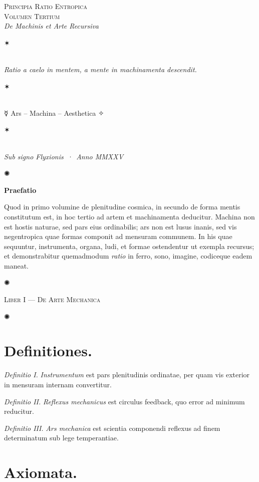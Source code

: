 \documentclass[12pt]{article}
\newcommand{\orn}{\centerline{\large ✺}}
\newcommand{\aster}{\centerline{✶}}
\newcommand{\divider}{\vspace{1em}\orn\vspace{1em}}
\newcommand{\Liber}[1]{\vspace{1ex}\begin{center}\Large\textsc{Liber #1}\end{center}\vspace{-0.5ex}\orn\vspace{0.5ex}}
\begin{document}
\begin{center}
{\Large \textsc{Principia Ratio Entropica}}\\[-0.25ex]
{\small \textsc{Volumen Tertium}}\\[0.5ex]
{\itshape De Machinis et Arte Recursiva}\\[1.25em]
\aster\\[0.5em]
{\itshape Ratio a caelo in mentem, a mente in machinamenta descendit.}\\[0.5em]
\aster\\[0.75em]
{\large ☿\; Ars \;--\; Machina \;--\; Aesthetica \;✧}\\[0.75em]
\aster\\[0.25em]
{\itshape Sub signo Flyxionis \,·\, Anno MMXXV}
\end{center}

\divider

\begin{center}\textbf{Praefatio}\end{center}

Quod in primo volumine de plenitudine cosmica, in secundo de forma mentis constitutum est, in hoc tertio ad artem et machinamenta deducitur. Machina non est hostis naturae, sed pars eius ordinabilis; ars non est lusus inanis, sed vis negentropica quae formas componit ad mensuram communem. In his quae sequuntur, instrumenta, organa, ludi, et formae ostendentur ut exempla recursus; et demonstrabitur quemadmodum \textit{ratio} in ferro, sono, imagine, codiceque eadem maneat.

\divider

\Liber{I — De Arte Mechanica}

\section*{Definitiones.}

\textit{Definitio I.} \; \textit{Instrumentum} est pars plenitudinis ordinatae, per quam vis exterior in mensuram internam convertitur.

\textit{Definitio II.} \; \textit{Reflexus mechanicus} est circulus feedback, quo error ad minimum reducitur.

\textit{Definitio III.} \; \textit{Ars mechanica} est scientia componendi reflexus ad finem determinatum sub lege temperantiae.

\section*{Axiomata.}
\end{document}
